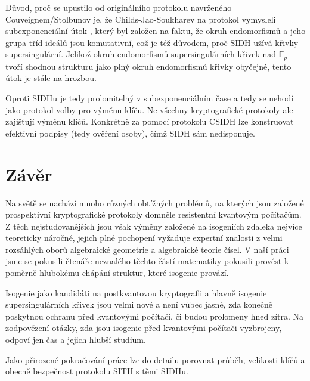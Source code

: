 \documentclass[12pt]{report}
\begin{document}
Důvod, proč se upustilo od originálního protokolu navrženého Couveignem/Stolbunov je, že Childs-Jao-Soukharev na protokol vymysleli subexponenciální útok \cite{Childs}, který byl založen na faktu, že okruh endomorfismů a jeho grupa tříd ideálů jsou komutativní, což je též důvodem, proč SIDH užívá křivky supersingulární. Jelikož okruh endomorfismů supersingulárních křivek nad $\mathbb{F}_p$ tvoří shodnou strukturu jako plný okruh endomorfismů křivky obyčejné, tento útok je stále na hrozbou.

Oproti SIDHu je tedy prolomitelný v subexponenciálním čase a tedy se nehodí jako protokol volby pro výměnu klíču. Ne všechny kryptografické protokoly ale zajišťují výměnu klíčů. Konkrétně za pomocí protokolu CSIDH lze konstruovat efektivní podpisy \cite{CSIFISH} (tedy ověření osoby), čímž SIDH sám nedisponuje. 

\chapter*{Závěr}

Na světě se nachází mnoho různých obtížných problémů, na kterých jsou založené prospektivní kryptografické protokoly domněle resistentní kvantovým počítačům. Z těch nejstudovanějších jsou však výměny založené na isogeniích zdaleka nejvíce teoreticky náročné, jejich plné pochopení vyžaduje expertní znalosti z velmi rozsáhlých oborů algebraické geometrie a algebraické teorie čísel. V naší práci jsme se pokusili čtenáře neznalého těchto částí matematiky pokusili provést k poměrně hlubokému chápání struktur, které isogenie provází.

Isogenie jako kandidáti na postkvantovou kryptografii a hlavně isogenie supersingulárních křivek jsou velmi nové a není vůbec jasné, zda konečně poskytnou ochranu před kvantovými počítači, či budou prolomeny hned zítra. Na zodpovězení otázky, zda jsou isogenie před kvantovými počítači vyzbrojeny, odpoví jen čas a jejich hlubší studium.

Jako přirozené pokračování práce lze do detailu porovnat průběh, velikosti klíčů a obecně bezpečnost protokolu SITH s těmi SIDHu. 




\end{document}
